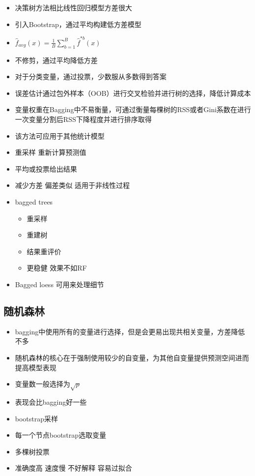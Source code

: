 \documentclass[]{book}
\providecommand{\tightlist}{%
  \setlength{\itemsep}{0pt}\setlength{\parskip}{0pt}}
\begin{document}
\begin{itemize}
\item
  决策树方法相比线性回归模型方差很大
\item
  引入Bootstrap，通过平均构建低方差模型
\item
  \(\hat f_{avg}(x) = \frac{1}{B} \sum_{b = 1}^B \hat f^{*b}(x)\)
\item
  不修剪，通过平均降低方差
\item
  对于分类变量，通过投票，少数服从多数得到答案
\item
  误差估计通过包外样本（OOB）进行交叉检验并进行树的选择，降低计算成本
\item
  变量权重在Bagging中不易衡量，可通过衡量每棵树的RSS或者Gini系数在进行一次变量分割后RSS下降程度并进行排序取得
\item
  该方法可应用于其他统计模型
\item
  重采样 重新计算预测值
\item
  平均或投票给出结果
\item
  减少方差 偏差类似 适用于非线性过程
\item
  bagged trees

  \begin{itemize}
  \tightlist
  \item
    重采样
  \item
    重建树
  \item
    结果重评价
  \item
    更稳健 效果不如RF
  \end{itemize}
\item
  Bagged loess 可用来处理细节
\end{itemize}

\hypertarget{ux968fux673aux68eeux6797}{%
\subsection{随机森林}\label{ux968fux673aux68eeux6797}}

\begin{itemize}
\tightlist
\item
  bagging中使用所有的变量进行选择，但是会更易出现共相关变量，方差降低不多
\item
  随机森林的核心在于强制使用较少的自变量，为其他自变量提供预测空间进而提高模型表现
\item
  变量数一般选择为\(\sqrt p\)
\item
  表现会比bagging好一些
\item
  bootstrap采样
\item
  每一个节点bootstrap选取变量
\item
  多棵树投票
\item
  准确度高 速度慢 不好解释 容易过拟合
\end{itemize}
\end{document}
